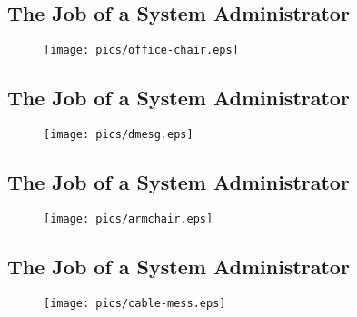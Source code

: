 \documentclass[xga]{xdvislides}
\begin{document}
\subsection{The Job of a System Administrator}
\vspace*{\fill}
\begin{figure}[hb]
	\begin{center}
		\texttt{[image: pics/office-chair.eps]} \\
	\end{center}
\end{figure}
\vspace*{\fill}

\subsection{The Job of a System Administrator}
\vspace*{\fill}
\begin{figure}[hb]
	\begin{center}
		\texttt{[image: pics/dmesg.eps]} \\
	\end{center}
\end{figure}
\vspace*{\fill}

\subsection{The Job of a System Administrator}
\vspace*{\fill}
\begin{figure}[hb]
	\begin{center}
		\texttt{[image: pics/armchair.eps]} \\
	\end{center}
\end{figure}
\vspace*{\fill}

\subsection{The Job of a System Administrator}
\vspace*{\fill}
\begin{figure}[hb]
	\begin{center}
		\texttt{[image: pics/cable-mess.eps]} \\
	\end{center}
\end{figure}
\vspace*{\fill}
\end{document}
